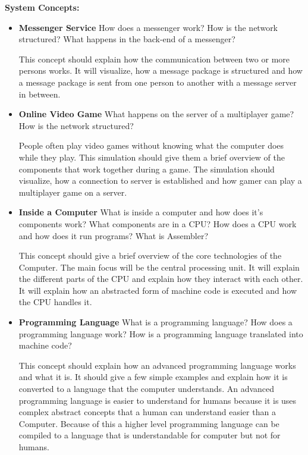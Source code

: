 \documentclass[12pt]{article}
\theoremstyle{definition}
\begin{document}
\textbf{System Concepts:}
\begin{itemize}
\item{\textbf{Messenger Service}}\newline
How does a messenger work?\newline
How is the network structured?\newline
What happens in the back-end of a messenger?

This concept should explain how the communication between two or more persons works. It will visualize, how a message package is structured and how a message package is sent from one person to another with a message server in between.
\item{\textbf{Online Video Game}}\newline
What happens on the server of a multiplayer game? \newline
How is the network structured?

People often play video games without knowing what the computer does while they play. This simulation should give them a brief overview of the components that work together during a game. The simulation should visualize, how a connection to server is established and how gamer can play a multiplayer game on a server.
\item\textbf{Inside a Computer}\newline
What is inside a computer and how does it's components work? \newline
What components are in a CPU?\newline
How does a CPU work and how does it run programs?\newline
What is Assembler?\newline

This concept should give a brief overview of the core technologies of the Computer. The main focus will be the central processing unit. It will explain the different parts of the CPU and explain how they interact with each other. It will explain how an abstracted form of machine code is executed and how the CPU handles it.

\pagebreak
\item\textbf{Programming Language}\newline
What is a programming language?\newline
How does a programming language work?\newline
How is a programming language translated into machine code?

This concept should explain how an advanced programming language works and what it is. It should give a few simple examples and explain how it is converted to a language that the computer understands. An advanced programming language is easier to understand for humans because it is uses complex abstract concepts that a human can understand easier than a Computer. Because of this a higher level programming language can be compiled to a language that is understandable for computer but not for humans. 


\end{itemize}
\end{document}
